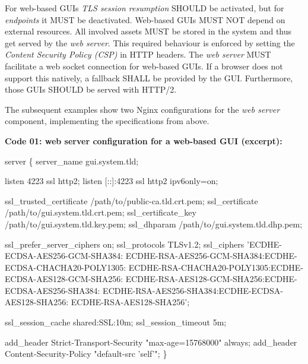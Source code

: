 \documentclass[12pt,english,a4paper,titlepage,cleardoublepage=empty,dottedtoc]{report}
\newenvironment{Shaded}{\begin{snugshade}}{\end{snugshade}}
\newcommand{\NormalTok}[1]{#1}
\begin{document}
For web-based GUIs \emph{TLS session resumption} SHOULD be activated,
but for \emph{endpoints} it MUST be deactivated. Web-based GUIs MUST NOT
depend on external resources. All involved assets MUST be stored in the
system and thus get served by the \emph{web server}. This required
behaviour is enforced by setting the \emph{Content Security Policy
(CSP)} in HTTP headers. The \emph{web server} MUST facilitate a web
socket connection for web-based GUIs. If a browser does not support this
natively, a fallback SHALL be provided by the GUI. Furthermore, those
GUIs SHOULD be served with HTTP/2.

The subsequent examples show two Nginx configurations for the \emph{web
server} component, implementing the specifications from above.

\textbf{\protect\hypertarget{spec_code-01_nginx-config-web-gui}{}{Code
01: web server configuration for a web-based GUI (excerpt)}:}

\begin{Shaded}
\begin{Highlighting}[numbers=left,,]
\NormalTok{server \{}
\NormalTok{    server_name gui.system.tld;}

\NormalTok{    listen 4223 ssl http2;}
\NormalTok{    listen [::]:4223 ssl http2 ipv6only=on;}
    
\NormalTok{    ssl_trusted_certificate /path/to/public-ca.tld.crt.pem;}
\NormalTok{    ssl_certificate         /path/to/gui.system.tld.crt.pem;}
\NormalTok{    ssl_certificate_key     /path/to/gui.system.tld.key.pem;}
\NormalTok{    ssl_dhparam             /path/to/gui.system.tld.dhp.pem;}
    
\NormalTok{    ssl_prefer_server_ciphers on;}
\NormalTok{    ssl_protocols TLSv1.2;}
\NormalTok{    ssl_ciphers 'ECDHE-ECDSA-AES256-GCM-SHA384:}
\NormalTok{        ECDHE-RSA-AES256-GCM-SHA384:ECDHE-ECDSA-CHACHA20-POLY1305:}
\NormalTok{        ECDHE-RSA-CHACHA20-POLY1305:ECDHE-ECDSA-AES128-GCM-SHA256:}
\NormalTok{        ECDHE-RSA-AES128-GCM-SHA256:ECDHE-ECDSA-AES256-SHA384:}
\NormalTok{        ECDHE-RSA-AES256-SHA384:ECDHE-ECDSA-AES128-SHA256:}
\NormalTok{        ECDHE-RSA-AES128-SHA256';}

\NormalTok{    ssl_session_cache shared:SSL:10m;}
\NormalTok{    ssl_session_timeout 5m;}
    
\NormalTok{    add_header Strict-Transport-Security "max-age=15768000" always;}
\NormalTok{    add_header Content-Security-Policy "default-src 'self'";}
\NormalTok{\}}
\end{Highlighting}
\end{Shaded}
\end{document}
